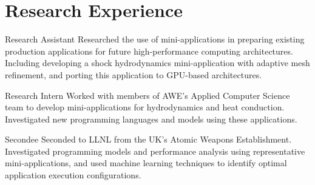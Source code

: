 \section{Research Experience}
    {Research Assistant}
    {}{}
    {
      Researched the use of  mini-applications in preparing existing production
      applications for future high-performance computing architectures.
      Including developing a shock hydrodynamics mini-application with adaptive
      mesh refinement, and porting this application to GPU-based architectures.
    }

    {Research Intern}
    {}{}
    {
    Worked with members of AWE's Applied Computer Science team to develop
    mini-applications for hydrodynamics and heat conduction. Investigated new
    programming languages and models using these applications.
    }

    {Secondee}
    {}{}
    {
      Seconded to LLNL from the UK's Atomic Weapons Establishment. Investigated
      programming models and performance analysis using representative
      mini-applications, and used machine learning techniques to identify optimal
      application execution configurations.
    }
